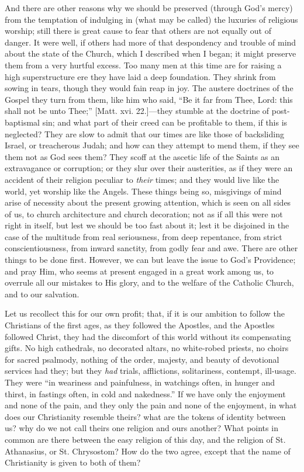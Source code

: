 And there are other reasons why we should be preserved (through
God's mercy) from the temptation of indulging in (what may be called)
the luxuries of religious worship; still there is great cause to fear
that others are not equally out of danger. It were well, if others had
more of that despondency and trouble of mind about the state of the
Church, which I described when I began; it might preserve them from a
very hurtful excess. Too many men at this time are for raising a high
superstructure ere they have laid a deep foundation. They shrink from
sowing in tears, though they would fain reap in joy. The austere
doctrines of the Gospel they turn from them, like him who said,
``Be it far from Thee, Lord: this shall not be unto Thee;''
[Matt. xvi. 22.]—they stumble at the doctrine of post-baptismal sin;
and what part of their creed can be profitable to them, if this is
neglected? They are slow to admit that our times are like those of
backsliding Israel, or treacherous Judah; and how can they attempt to
mend them, if they see them not as God sees them? They scoff at the
ascetic life of the Saints as an extravagance or corruption; or they
slur over their austerities, as if they were an accident of their
religion peculiar to \emph{their} times; and they would live like the
world, yet worship like the Angels. These things being so, misgivings
of mind arise of necessity about the present growing attention, which
is seen on all sides of us, to church architecture and church
decoration; not as if all this were not right in itself, but lest we
should be too fast about it; lest it be disjoined in the case of the
multitude from real seriousness, from deep repentance, from strict
conscientiousness, from inward sanctity, from godly fear and awe.
There are other things to be done first. However, we can but leave the
issue to God's Providence; and pray Him, who seems at present engaged
in a great work among us, to overrule all our mistakes to His glory,
and to the welfare of the Catholic Church, and to our salvation.

Let us recollect this for our own profit; that, if it is our
ambition to follow the Christians of the first ages, as they followed
the Apostles, and the Apostles followed Christ, they had the
discomfort of this world without its compensating gifts. No high
cathedrals, no decorated altars, no white-robed priests, no choirs for
sacred psalmody, nothing of the order, majesty, and beauty of
devotional services had they; but they \emph{had} trials, afflictions,
solitariness, contempt, ill-usage. They were ``in weariness and
painfulness, in watchings often, in hunger and thirst, in fastings
often, in cold and nakedness.'' If we have only the enjoyment and
none of the pain, and they only the pain and none of the enjoyment, in
what does our Christianity resemble theirs? what are the tokens of
identity between us? why do we not call theirs one religion and ours
another? What points in common are there between the easy religion of
this day, and the religion of St. Athanasius, or St. Chrysostom? How
do the two agree, except that the name of Christianity is given to
both of them?

